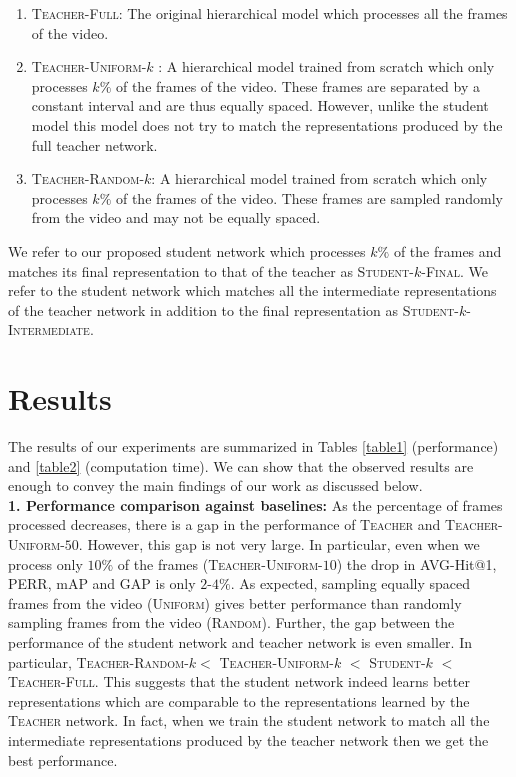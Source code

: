 \documentclass[10pt,twocolumn,letterpaper]{article}
\newcommand{\Model}{\textsc{TeaStud}\xspace}
\newcommand{\tea}{\textsc{Teacher}\xspace}
\newcommand{\stud}{\textsc{Student}\xspace}
\newcommand{\full}{\textsc{Teacher-Full}}
\newcommand{\uniform}[1]{\textsc{Teacher-Uniform-}$#1$}
\newcommand{\random}[1]{\textsc{Teacher-Random-}$#1$}
\newcommand{\final}[1]{\textsc{Student-}$#1$\textsc{-Final}}
\newcommand{\inter}[1]{\textsc{Student-}$#1$\textsc{-Intermediate}}
\begin{document}
\begin{enumerate}[leftmargin=*,label=\alph*)]
\item \full: The original hierarchical model which processes all the frames of the video.
\item \uniform{k} : A hierarchical model trained from scratch which only processes $k\%$ of the frames of the video. These frames are separated by a constant interval and are thus equally spaced. However, unlike the student model this model does not try to match the representations produced by the full teacher network. 
\item \random{k}:  A hierarchical model trained from scratch which only processes $k\%$ of the frames of the video. These frames are sampled randomly from the video and may not be equally spaced.
\end{enumerate}

We refer to our proposed student network which processes $k\%$ of the frames and matches its final representation to that of the teacher as \final{k}. We refer to the student network which matches all the intermediate representations of the teacher network in addition to the final representation as  \inter{k}.



\section{Results} 
The results of our experiments are summarized in Tables \ref{table1} (performance) and \ref{table2} (computation time). We can show that the observed results are enough to convey the main findings of our work as discussed below. \\
\noindent\textbf{1. Performance comparison against baselines:} As the percentage of frames processed decreases, there is a gap in the performance of \tea and \uniform{50}. However, this gap is not very large. In particular, even when we process only $10\%$ of the frames (\uniform{10}) the drop in AVG-Hit@1, PERR, mAP and GAP is only $2$-$4\%$. As expected, sampling equally spaced frames from the video (\textsc{Uniform}) gives better performance than randomly sampling frames from the video (\textsc{Random}). Further, the gap between the performance of the student network and teacher network is even smaller. In particular, \random{k}$<$ \uniform{k} $<$ \stud-$k$ $<$ \full. This suggests that the student network indeed learns better representations which are comparable to the representations learned by the \tea network. In fact, when we train the student network to match all the intermediate representations produced by the teacher network then we get the best performance. 
\end{document}
